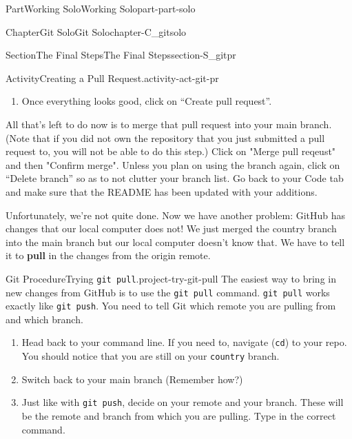 \documentclass[twoside,10pt,]{book}
\newcommand{\xreffont}{\relax}
\newcommand{\mono}[1]{\texttt{#1}}
\newcommand{\terminology}[1]{\textbf{#1}}
\begin{document}
\begin{partptx}{Part}{Working Solo}{}{Working Solo}{}{}{part-part-solo}
\begin{chapterptx}{Chapter}{Git Solo}{}{Git Solo}{}{}{chapter-C_gitsolo}
\begin{sectionptx}{Section}{The Final Steps}{}{The Final Steps}{}{}{section-S_gitpr}
\begin{activity}{Activity}{Creating a Pull Request.}{activity-act-git-pr}
\begin{enumerate}[font=\bfseries,label=(\alph*),ref=\alph*]
\par
Note the drop-down menus at the top of the page. With these, you can easily decide which branches you want to merge into and which branches you are merging from. You should only see two choices since we only have two branches but this will not always be the case (especially if you are merging from an origin to an upstream, see \hyperref[section-S_gitcollabpr]{Section~{\xreffont\ref{section-S_gitcollabpr}}, p.\,\pageref{section-S_gitcollabpr}}).%
\par
You can also scroll down and see all of the files that were changed and all of the changes. This is good to check that everything is as you expected. This also works to check that someone who is trying to contribute to your repo is not destroying your project.%
\item{}Once everything looks good, click on ``Create pull request''.%
\end{enumerate}%
All that's left to do now is to merge that pull request into your main branch. (Note that if you did not own the repository that you just submitted a pull request to, you will not be able to do this step.) Click on "Merge pull reqeust" and then "Confirm merge". Unless you plan on using the branch again, click on ``Delete branch'' so as to not clutter your branch list. Go back to your Code tab and make sure that the README has been updated with your additions.%
\end{activity}%
 Unfortunately, we're not quite done. Now we have another problem: GitHub has changes that our local computer does not! We just merged the country branch into the main branch but our local computer doesn't know that. We have to tell it to \terminology{pull} in the changes from the origin remote.%
\begin{project}{Git Procedure}{Trying \mono{git pull}.}{project-try-git-pull}%
%
%
The easiest way to bring in new changes from GitHub is to use the \mono{git pull} command. \mono{git pull} works exactly like \mono{git push}. You need to tell Git which remote you are pulling from and which branch.%
\begin{enumerate}[font=\bfseries,label=(\alph*),ref=\alph*]%
\item{}Head back to your command line. If you need to, navigate (\mono{cd}) to your repo. You should notice that you are still on your \mono{country} branch.%
\item{}Switch back to your main branch (Remember how?)%
\item{}Just like with \mono{git push}, decide on your remote and your branch. These will be the remote and branch from which you are pulling. Type in the correct command.%

\end{enumerate}
\end{project}
\end{sectionptx}
\end{chapterptx}
\end{partptx}
\end{document}
